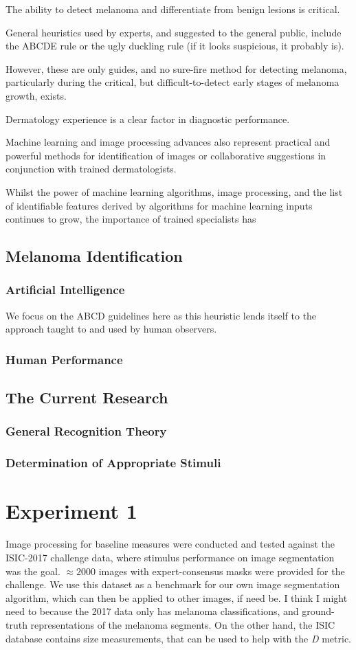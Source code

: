 \documentclass[a4paper, natbib, doc, 12pt]{apa7}
\begin{document}
The ability to detect melanoma and differentiate from benign lesions is critical. 

General heuristics used by experts, and suggested to the general public, include the ABCDE rule or the ugly duckling rule (if it looks suspicious, it probably is). 


However, these are only guides, and no sure-fire method for detecting melanoma, particularly during the critical, but difficult-to-detect early stages of melanoma growth, exists. 

Dermatology experience is a clear factor in diagnostic performance. 

Machine learning and image processing advances also represent practical and powerful methods for identification of images or collaborative suggestions in conjunction with trained dermatologists. 

Whilst the power of machine learning algorithms, image processing, and the list of identifiable features derived by algorithms for machine learning inputs continues to grow, the importance of trained specialists has

\subsection{Melanoma Identification}
\subsubsection{Artificial Intelligence}
We focus on the ABCD guidelines here as this heuristic lends itself to the approach taught to and used by human observers. 

\subsubsection{Human Performance}
\subsection{The Current Research}
\subsubsection{General Recognition Theory}
\subsubsection{Determination of Appropriate Stimuli}
\section{Experiment 1}
Image processing for baseline measures were conducted and tested against the ISIC-2017 challenge data, where stimulus performance on image segmentation was the goal. $\approx2000$ images with expert-consensus masks were provided for the challenge. We use this dataset as a benchmark for our own image segmentation algorithm, which can then be applied to other images, if need be. I think I might need to because the 2017 data only has melanoma classifications, and ground-truth representations of the melanoma segments. On the other hand, the ISIC database contains size measurements, that can be used to help with the \textit{D} metric. 
\end{document}
